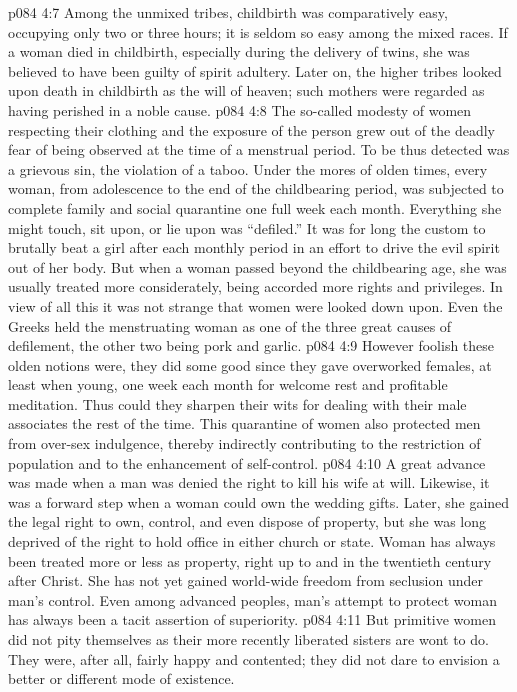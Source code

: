 \vs p084 4:7 Among the unmixed tribes, childbirth was comparatively easy, occupying only two or three hours; it is seldom so easy among the mixed races. If a woman died in childbirth, especially during the delivery of twins, she was believed to have been guilty of spirit adultery. Later on, the higher tribes looked upon death in childbirth as the will of heaven; such mothers were regarded as having perished in a noble cause.
\vs p084 4:8 The so\hyp{}called modesty of women respecting their clothing and the exposure of the person grew out of the deadly fear of being observed at the time of a menstrual period. To be thus detected was a grievous sin, the violation of a taboo. Under the mores of olden times, every woman, from adolescence to the end of the childbearing period, was subjected to complete family and social quarantine one full week each month. Everything she might touch, sit upon, or lie upon was “defiled.” It was for long the custom to brutally beat a girl after each monthly period in an effort to drive the evil spirit out of her body. But when a woman passed beyond the childbearing age, she was usually treated more considerately, being accorded more rights and privileges. In view of all this it was not strange that women were looked down upon. Even the Greeks held the menstruating woman as one of the three great causes of defilement, the other two being pork and garlic.
\vs p084 4:9 However foolish these olden notions were, they did some good since they gave overworked females, at least when young, one week each month for welcome rest and profitable meditation. Thus could they sharpen their wits for dealing with their male associates the rest of the time. This quarantine of women also protected men from over\hyp{}sex indulgence, thereby indirectly contributing to the restriction of population and to the enhancement of self\hyp{}control.
\vs p084 4:10 \pc A great advance was made when a man was denied the right to kill his wife at will. Likewise, it was a forward step when a woman could own the wedding gifts. Later, she gained the legal right to own, control, and even dispose of property, but she was long deprived of the right to hold office in either church or state. Woman has always been treated more or less as property, right up to and in the twentieth century after Christ. She has not yet gained world\hyp{}wide freedom from seclusion under man’s control. Even among advanced peoples, man’s attempt to protect woman has always been a tacit assertion of superiority.
\vs p084 4:11 But primitive women did not pity themselves as their more recently liberated sisters are wont to do. They were, after all, fairly happy and contented; they did not dare to envision a better or different mode of existence.
